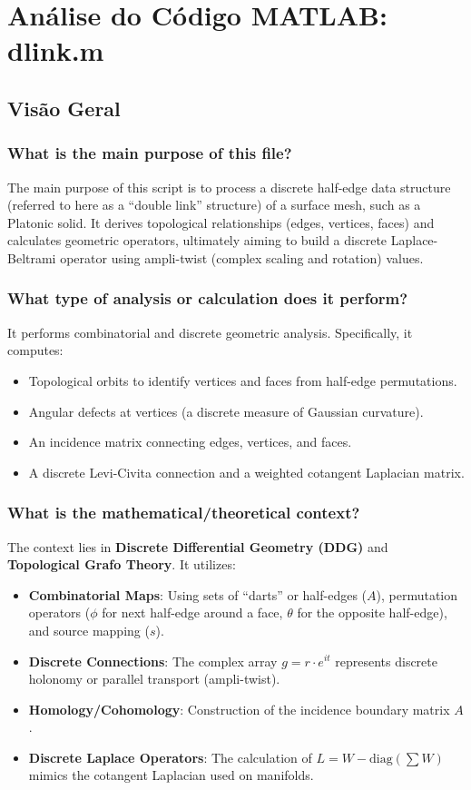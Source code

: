 

\chapter{Análise do Código MATLAB: dlink.m}
\section*{Visão Geral}

\subsection*{What is the main purpose of this file?}
The main purpose of this script is to process a discrete half-edge data structure (referred to here as a ``double link'' structure) of a surface mesh, such as a Platonic solid. It derives topological relationships (edges, vertices, faces) and calculates geometric operators, ultimately aiming to build a discrete Laplace-Beltrami operator using ampli-twist (complex scaling and rotation) values. 

\subsection*{What type of analysis or calculation does it perform?}
It performs combinatorial and discrete geometric analysis. Specifically, it computes:
\begin{itemize}
    \item Topological orbits to identify vertices and faces from half-edge permutations.
    \item Angular defects at vertices (a discrete measure of Gaussian curvature).
    \item An incidence matrix connecting edges, vertices, and faces.
    \item A discrete Levi-Civita connection and a weighted cotangent Laplacian matrix.
\end{itemize}

\subsection*{What is the mathematical/theoretical context?}
The context lies in \textbf{Discrete Differential Geometry (DDG)} and \textbf{Topological Grafo Theory}. It utilizes:
\begin{itemize}
    \item \textbf{Combinatorial Maps}: Using sets of ``darts'' or half-edges ($A$), permutation operators ($\phi$ for next half-edge around a face, $\theta$ for the opposite half-edge), and source mapping ($s$).
    \item \textbf{Discrete Connections}: The complex array $g = r \cdot e^{it}$ represents discrete holonomy or parallel transport (ampli-twist).
    \item \textbf{Homology/Cohomology}: Construction of the incidence boundary matrix $A$.
    \item \textbf{Discrete Laplace Operators}: The calculation of $L = W - \text{diag}(\sum W)$ mimics the cotangent Laplacian used on manifolds.
\end{itemize}

